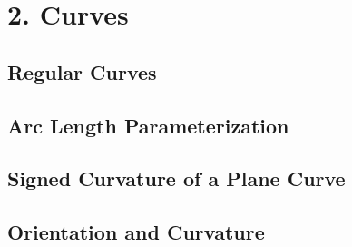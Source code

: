 
\section[Lecture 2--{Curves}]{2. Curves}

\subsection{Regular Curves}

\subsection{Arc Length Parameterization}

\subsection{Signed Curvature of a Plane Curve}

\subsection{Orientation and Curvature}

